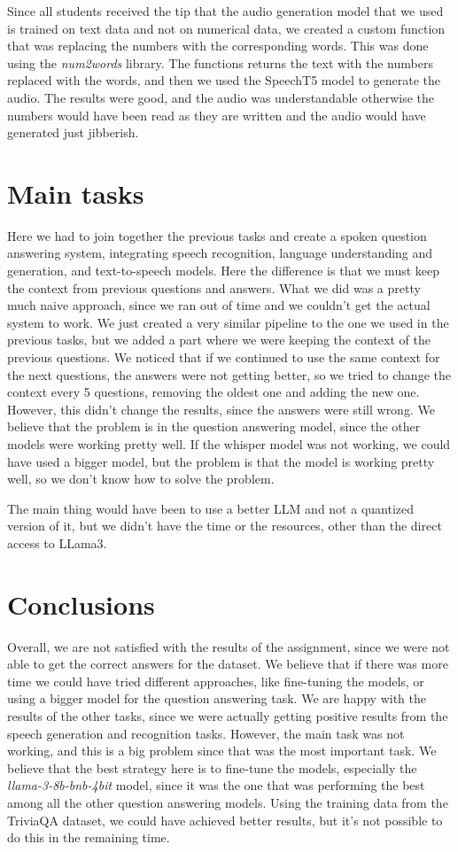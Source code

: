 \documentclass{Interspeech2024}
\begin{document}
Since all students received the tip that the audio generation model
that we used is trained on text data and not 
on numerical data, we created a custom function that was 
replacing the numbers with the corresponding words.
This was done using the \textit{num2words} library. The functions returns 
the text with the numbers replaced with the words, and then we used
the SpeechT5 model to generate the audio. The results were good,
and the audio was understandable otherwise the numbers would have been
read as they are written and the audio would have generated
just jibberish.

\section{Main tasks}

Here we had to join together the previous tasks and create a
spoken question answering system, integrating speech 
recognition, language understanding and generation, 
and text-to-speech models. Here the difference is that 
we must keep the context from previous questions and answers.
What we did was a pretty much naive approach, since we 
ran out of time and we couldn't get the actual system to work.
We just created a very similar pipeline to the one we used
in the previous tasks, but we added a part where we were
keeping the context of the previous questions. We noticed that 
if we continued to use the same context for the next questions,
the answers were not getting better, so we tried to change the
context every 5 questions, removing the oldest one and adding
the new one. However, this didn't change the results, since the
answers were still wrong. We believe that the problem is in the
question answering model, since the other models were working
pretty well. If the whisper model was not working, we could have 
used a bigger model, but the problem is that the model is working
pretty well, so we don't know how to solve the problem.

The main thing would have been to use a better LLM and not 
a quantized version of it, but we didn't have the time or 
the resources, other than the direct access to LLama3. 


\section{Conclusions}

Overall, we are not satisfied with the results of the assignment,
since we were not able to get the correct answers for the dataset.
We believe that if there was more time 
we could have tried different approaches, like fine-tuning the
models, or using a bigger model for the question answering task.
We are happy with the results of the other tasks, since we were 
actually getting positive results from the speech generation and 
recognition tasks. However, the main task was not working, and
this is a big problem since that was the most important task. 
We believe that the best strategy here is to 
fine-tune the models, especially the \textit{llama-3-8b-bnb-4bit} model,
since it was the one that was performing the best among all the 
other question answering models. Using the training data from the 
TriviaQA dataset, we could have achieved better results, but 
it's not possible to do this in the remaining time.
\end{document}
